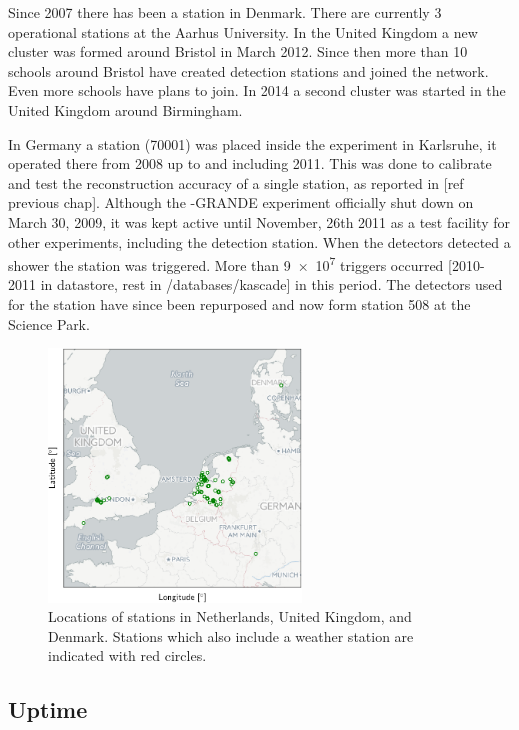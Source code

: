 Since 2007 there has been a \hisparc station in Denmark. There are currently 3 operational stations at the Aarhus University. In the United Kingdom a new cluster was formed around Bristol in March 2012. Since then more than 10 schools around Bristol have created detection stations and joined the network. Even more schools have plans to join. In 2014 a second cluster was started in the United Kingdom around Birmingham.

In Germany a station (70001) was placed inside the \kascade experiment in Karlsruhe, it operated there from 2008 up to and including 2011. This was done to calibrate and test the reconstruction accuracy of a single \hisparc station, as reported in [ref previous chap]. Although the \kascade-GRANDE experiment officially shut down on March 30, 2009, it was kept active until November, 26th 2011 as a test facility for other experiments, including the \hisparc detection station. When the \kascade detectors detected a shower the \hisparc station was triggered. More than \num{9e7} triggers occurred [2010-2011 in datastore, rest in /databases/kascade] in this period. The detectors used for the \kascade station have since been repurposed and now form station 508 at the Science Park.

\begin{figure}
    \centering
    \includegraphics[width=0.6\textwidth]
                    {plots/cluster/network}
    \caption{Locations of \hisparc stations in Netherlands, United Kingdom, and Denmark. Stations which also include a weather station are indicated with red circles.}
    \label{fig:network}
\end{figure}


\subsection{Uptime}

